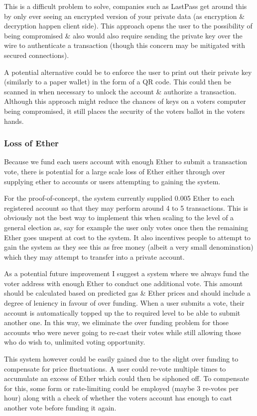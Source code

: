 \documentclass{article}
\begin{document}
	This is a difficult problem to solve, companies such as LastPass get around this by only ever seeing an encrypted version of your private data (as encryption \& decryption happen client side). This approach opens the user to the possibility of being compromised \& also would also require sending the private key over the wire to authenticate a transaction (though this concern may be mitigated with secured connections).
		
	A potential alternative could be to enforce the user to print out their private key (similarly to a paper wallet) in the form of a QR code. This could then be scanned in when necessary to unlock the account \& authorize a transaction. Although this approach might reduce the chances of keys on a voters computer being compromised, it still places the security of the voters ballot in the voters hands.

	\subsubsection{Loss of Ether}	
	Because we fund each users account with enough Ether to submit a transaction vote, there is potential for a large scale loss of Ether either through over supplying ether to accounts or users attempting to gaining the system. 
	
	For the proof-of-concept, the system currently supplied 0.005 Ether to each registered account so that they may perform around 4 to 5 transactions. This is obviously not the best way to implement this when scaling to the level of a general election as, say for example the user only votes once then the remaining Ether goes unspent at cost to the system. It also incentives people to attempt to gain the system as they see this as free money (albeit a very small denomination) which they may attempt to transfer into a private account.
	
	As a potential future improvement I suggest a system where we always fund the voter address with enough Ether to conduct one additional vote. This amount should be calculated based on predicted gas \& Ether prices and should include a degree of leniency in favour of over funding. When a user submits a vote, their account is automatically topped up the to required level to be able to submit another one. In this way, we eliminate the over funding problem for those accounts who were never going to re-cast their votes while still allowing those who do wish to, unlimited voting opportunity.
	
	This system however could be easily gained due to the slight over funding to compensate for price fluctuations. A user could re-vote multiple times to accumulate an excess of Ether which could then be siphoned off. To compensate for this, some form or rate-limiting could be employed (maybe 3 re-votes per hour) along with a check of whether the voters account has enough to cast another vote before funding it again.
	
\end{document}
